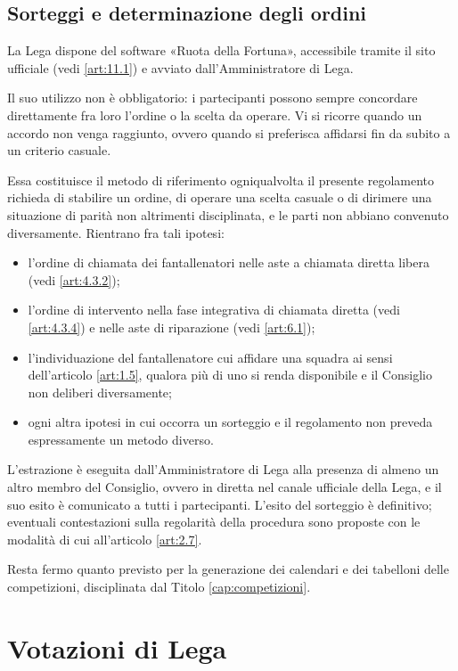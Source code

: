 \section{Sorteggi e determinazione degli ordini}
\label{art:1.6}

La Lega dispone del software «Ruota della Fortuna», accessibile tramite il sito ufficiale (vedi \ref{art:11.1}) e avviato dall'Amministratore di Lega.

Il suo utilizzo non è obbligatorio: i partecipanti possono sempre concordare direttamente fra loro l'ordine o la scelta da operare. Vi si ricorre quando un accordo non venga raggiunto, ovvero quando si preferisca affidarsi fin da subito a un criterio casuale.

Essa costituisce il metodo di riferimento ogniqualvolta il presente regolamento richieda di stabilire un ordine, di operare una scelta casuale o di dirimere una situazione di parità non altrimenti disciplinata, e le parti non abbiano convenuto diversamente. Rientrano fra tali ipotesi:

\begin{itemize}
\item l'ordine di chiamata dei fantallenatori nelle aste a chiamata diretta libera (vedi \ref{art:4.3.2});
\item l'ordine di intervento nella fase integrativa di chiamata diretta (vedi \ref{art:4.3.4}) e nelle aste di riparazione (vedi \ref{art:6.1});
\item l'individuazione del fantallenatore cui affidare una squadra ai sensi dell'articolo \ref{art:1.5}, qualora più di uno si renda disponibile e il Consiglio non deliberi diversamente;
\item ogni altra ipotesi in cui occorra un sorteggio e il regolamento non preveda espressamente un metodo diverso.
\end{itemize}

L'estrazione è eseguita dall'Amministratore di Lega alla presenza di almeno un altro membro del Consiglio, ovvero in diretta nel canale ufficiale della Lega, e il suo esito è comunicato a tutti i partecipanti. L'esito del sorteggio è definitivo; eventuali contestazioni sulla regolarità della procedura sono proposte con le modalità di cui all'articolo \ref{art:2.7}.

Resta fermo quanto previsto per la generazione dei calendari e dei tabelloni delle competizioni, disciplinata dal Titolo \ref{cap:competizioni}.


\chapter{Votazioni di Lega}
\label{cap:Votazioni}

